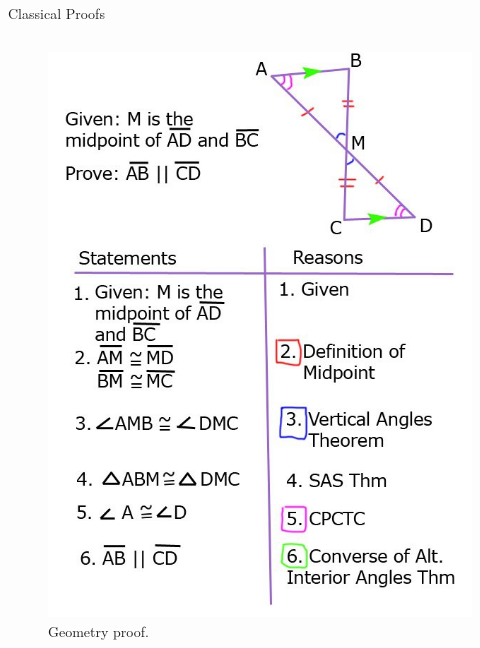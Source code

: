 \documentclass[xcolor={usenames,dvipsnames}]{beamer}
\begin{document}
\begin{frame}{Classical Proofs}
\begin{columns}
\begin{column}{0.4\textwidth}
\begin{figure}
                    \includegraphics[width=1.0\textwidth]{images/lecture_6/geometry-proof.jpg}
                    \caption{Geometry proof.}
                \end{figure}
            \end{column}
            \end{columns}
    \end{frame}
\end{document}
